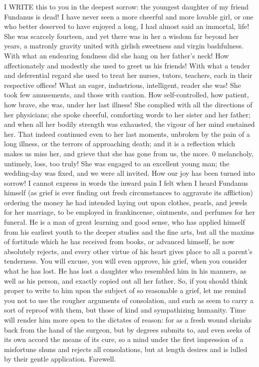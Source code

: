 I WRITE this to you in the deepest sorrow: the youngest daughter of my
friend Fundanus is dead! I have never seen a more cheerful and more
lovable girl, or one who better deserved to have enjoyed a long, I had
almost said an immortal, life! She was scarcely fourteen, and yet there
was in her a wisdom far beyond her years, a matronly gravity united with
girlish sweetness and virgin bashfulness. With what an endearing fondness
did she hang on her father's neck! How affectionately and modestly she
used to greet us his friends! With what a tender and deferential regard
she used to treat her nurses, tutors, teachers, each in their respective
offices! What an eager, industrious, intelligent, reader she was! She took
few amusements, and those with caution. How self-controlled, how patient,
how brave, she was, under her last illness! She complied with all the
directions of her physicians; she spoke cheerful, comforting words to her
sister and her father; and when all her bodily strength was exhausted, the
vigour of her mind sustained her. That indeed continued even to her last
moments, unbroken by the pain of a long illness, or the terrors of
approaching death; and it is a reflection which makes us miss her, and
grieve that she has gone from us, the more. 0 melancholy, untimely, loss,
too truly! She was engaged to an excellent young man; the wedding-day was
fixed, and we were all invited. How our joy has been turned into sorrow! I
cannot express in words the inward pain I felt when I heard Fundanus
himself (as grief is ever finding out fresh circumstances to aggravate its
affliction) ordering the money he had intended laying out upon clothes,
pearls, and jewels for her marriage, to be employed in frankincense,
ointments, and perfumes for her funeral. He is a man of great learning and
good sense, who has applied himself from his earliest youth to the deeper
studies and the fine arts, but all the maxims of fortitude which he has
received from books, or advanced himself, he now absolutely rejects, and
every other virtue of his heart gives place to all a parent's tenderness.
You will excuse, you will even approve, his grief, when you consider what
he has lost. He has lost a daughter who resembled him in his manners, as
well as his person, and exactly copied out all her father. So, if you
should think proper to write to him upon the subject of so reasonable a
grief, let me remind you not to use the rougher arguments of consolation,
and such as seem to carry a sort of reproof with them, but those of kind
and sympathizing humanity. Time will render him more open to the dictates
of reason: for as a fresh wound shrinks back from the hand of the surgeon,
but by degrees submits to, and even seeks of its own accord the means of
its cure, so a mind under the first impression of a misfortune shuns and
rejects all consolations, but at length desires and is lulled by their
gentle application. Farewell.

